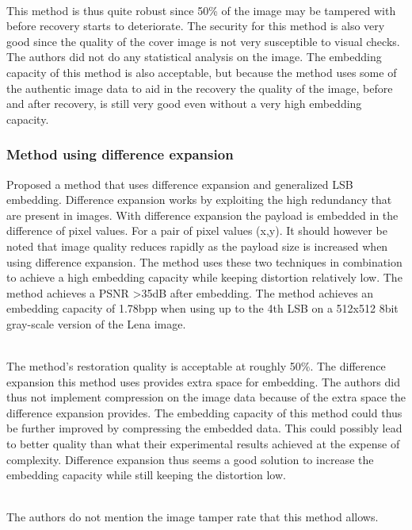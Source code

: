 \documentclass[12pt]{article}
\begin{document}
\hspace{0pt} \\
This method \cite {korus2013efficient} is thus quite robust since 50\% of the image may be tampered with before recovery starts to deteriorate.
The security for this method is also very good since the quality of the cover image is not very susceptible to visual checks.
The authors did not do any statistical analysis on the image.
The embedding capacity of this method is also acceptable, but because the method uses some of the authentic image data to aid in the recovery the quality of the image, before and after recovery, is still very good even without a very high embedding capacity.  

\subsubsection{Method using difference expansion}
\label{differenceExpansionOverview}
\cite {tian2003high} Proposed a method that uses difference expansion and generalized LSB embedding.
Difference expansion works by exploiting the high redundancy that are present in images.
With difference expansion the payload is embedded in the difference of pixel values. 
For a pair of pixel values (x,y). \cite {tian2002reversible}
It should however be noted that image quality reduces rapidly as the payload size is increased when using difference expansion. 
The method uses these two techniques in combination to achieve a high embedding capacity while keeping distortion relatively low.
The method achieves a PSNR \textgreater 35dB after embedding.
The method achieves an embedding capacity of 1.78bpp when using up to the 4th LSB on a 512x512 8bit gray-scale version of the Lena image.

\hspace{0pt} \\
The method's \cite {tian2003high} restoration quality is acceptable at roughly 50\%. 
The difference expansion this method uses provides extra space for embedding.
The authors did thus not implement compression on the image data because of the extra space the difference expansion provides.
The embedding capacity of this method could thus be further improved by compressing the embedded data. This could possibly lead to better quality than what their experimental results achieved at the expense of complexity.
Difference expansion thus seems a good solution to increase the embedding capacity while still keeping the distortion low.

\hspace{0pt} \\ 
The authors do not mention the image tamper rate that this method \cite {tian2003high} allows.
\end{document}
